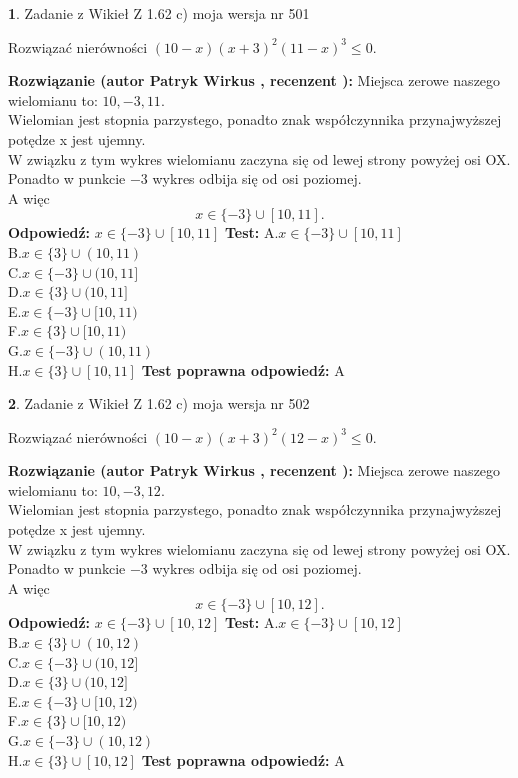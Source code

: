 \documentclass[12pt, a4paper]{article}
\theoremstyle{definition} %
\newtheorem{zad}{}
\newcommand{\zadStart}[1]{\begin{zad}#1\newline}
\newcommand{\zadStop}{\end{zad}}
\newcommand{\rozwStart}[2]{\noindent \textbf{Rozwiązanie (autor #1 , recenzent #2): }\newline}
\newcommand{\rozwStop}{\newline}
\newcommand{\odpStart}{\noindent \textbf{Odpowiedź:}\newline}
\newcommand{\odpStop}{\newline}
\newcommand{\testStart}{\noindent \textbf{Test:}\newline}
\newcommand{\testStop}{\newline}
\newcommand{\kluczStart}{\noindent \textbf{Test poprawna odpowiedź:}\newline}
\newcommand{\kluczStop}{\newline}
\begin{document}
\zadStart{Zadanie z Wikieł Z 1.62 c) moja wersja nr 501}

Rozwiązać nierówności $(10-x)(x+3)^{2}(11-x)^{3}\le0$.
\zadStop
\rozwStart{Patryk Wirkus}{}
Miejsca zerowe naszego wielomianu to: $10, -3, 11$.\\
Wielomian jest stopnia parzystego, ponadto znak współczynnika przy\linebreak najwyższej potędze x jest ujemny.\\ W związku z tym wykres wielomianu zaczyna się od lewej strony powyżej osi OX.\\
Ponadto w punkcie $-3$ wykres odbija się od osi poziomej.\\
A więc $$x \in \{-3\} \cup [10,11].$$
\rozwStop
\odpStart
$x \in \{-3\} \cup [10,11]$
\odpStop
\testStart
A.$x \in \{-3\} \cup [10,11]$\\
B.$x \in \{3\} \cup (10,11)$\\
C.$x \in \{-3\} \cup (10,11]$\\
D.$x \in \{3\} \cup (10,11]$\\
E.$x \in \{-3\} \cup [10,11)$\\
F.$x \in \{3\} \cup [10,11)$\\
G.$x \in \{-3\} \cup (10,11)$\\
H.$x \in \{3\} \cup [10,11]$
\testStop
\kluczStart
A
\kluczStop



\zadStart{Zadanie z Wikieł Z 1.62 c) moja wersja nr 502}

Rozwiązać nierówności $(10-x)(x+3)^{2}(12-x)^{3}\le0$.
\zadStop
\rozwStart{Patryk Wirkus}{}
Miejsca zerowe naszego wielomianu to: $10, -3, 12$.\\
Wielomian jest stopnia parzystego, ponadto znak współczynnika przy\linebreak najwyższej potędze x jest ujemny.\\ W związku z tym wykres wielomianu zaczyna się od lewej strony powyżej osi OX.\\
Ponadto w punkcie $-3$ wykres odbija się od osi poziomej.\\
A więc $$x \in \{-3\} \cup [10,12].$$
\rozwStop
\odpStart
$x \in \{-3\} \cup [10,12]$
\odpStop
\testStart
A.$x \in \{-3\} \cup [10,12]$\\
B.$x \in \{3\} \cup (10,12)$\\
C.$x \in \{-3\} \cup (10,12]$\\
D.$x \in \{3\} \cup (10,12]$\\
E.$x \in \{-3\} \cup [10,12)$\\
F.$x \in \{3\} \cup [10,12)$\\
G.$x \in \{-3\} \cup (10,12)$\\
H.$x \in \{3\} \cup [10,12]$
\testStop
\kluczStart
A
\kluczStop
\end{document}
